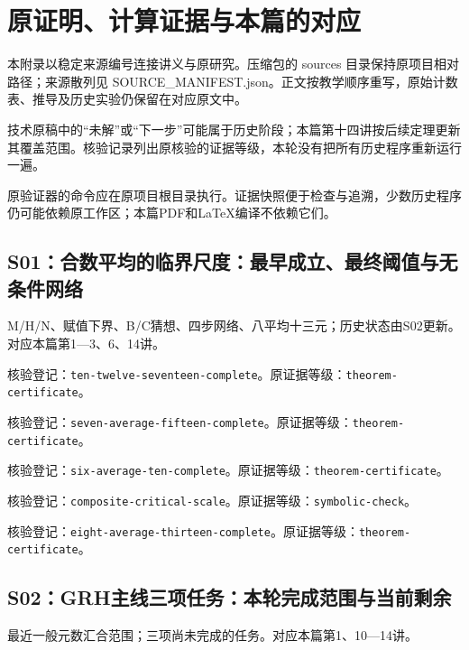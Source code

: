 \appendix

\chapter{原证明、计算证据与本篇的对应}

本附录以稳定来源编号连接讲义与原研究。压缩包的 sources 目录保持原项目相对路径；来源散列见 SOURCE\_MANIFEST.json。正文按教学顺序重写，原始计数表、推导及历史实验仍保留在对应原文中。

技术原稿中的“未解”或“下一步”可能属于历史阶段；本篇第十四讲按后续定理更新其覆盖范围。核验记录列出原核验的证据等级，本轮没有把所有历史程序重新运行一遍。

原验证器的命令应在原项目根目录执行。证据快照便于检查与追溯，少数历史程序仍可能依赖原工作区；本篇PDF和LaTeX编译不依赖它们。

\section{S01：合数平均的临界尺度：最早成立、最终阈值与无条件网络}\label{source:S01}

M/H/N、赋值下界、B/C猜想、四步网络、八平均十三元；历史状态由S02更新。对应本篇第1—3、6、14讲。

\par{}\par

核验登记：{\small\nolinkurl{ten-twelve-seventeen-complete}}。原证据等级：{\small\nolinkurl{theorem-certificate}}。

核验登记：{\small\nolinkurl{seven-average-fifteen-complete}}。原证据等级：{\small\nolinkurl{theorem-certificate}}。

核验登记：{\small\nolinkurl{six-average-ten-complete}}。原证据等级：{\small\nolinkurl{theorem-certificate}}。

核验登记：{\small\nolinkurl{composite-critical-scale}}。原证据等级：{\small\nolinkurl{symbolic-check}}。

核验登记：{\small\nolinkurl{eight-average-thirteen-complete}}。原证据等级：{\small\nolinkurl{theorem-certificate}}。

\section{S02：GRH主线三项任务：本轮完成范围与当前剩余}\label{source:S02}

最近一般元数汇合范围；三项尚未完成的任务。对应本篇第1、10—14讲。

